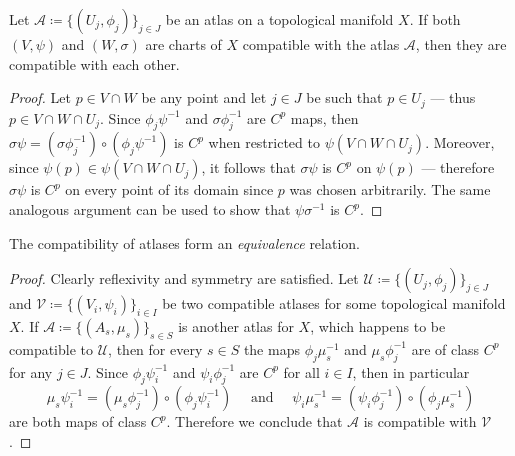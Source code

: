 \begin{lemma}
    \label{lem:compatible-charts-with-atlas-are-compatible}
    Let \(\mathcal{A} \coloneq \{(U_j, \phi_j)\}_{j \in J}\) be an atlas on a
    topological manifold \(X\). If both \((V, \psi)\) and \((W, \sigma)\) are charts
    of \(X\) compatible with the atlas \(\mathcal{A}\), then they are compatible
    with each other.
\end{lemma}

\begin{proof}
    Let \(p \in V \cap W\) be any point and let \(j \in J\) be such that
    \(p \in U_j\) --- thus \(p \in V \cap W \cap U_j\). Since \(\phi_j \psi^{-1}\)
    and \(\sigma \phi_j^{-1}\) are \(C^p\) maps, then
    \(\sigma \psi = (\sigma \phi_j^{-1}) \circ (\phi_j \psi^{-1})\) is \(C^p\) when
    restricted to \(\psi(V \cap W \cap U_j)\). Moreover, since
    \(\psi(p) \in \psi(V \cap W \cap U_j)\), it follows that \(\sigma \psi\) is
    \(C^p\) on \(\psi(p)\) --- therefore \(\sigma \psi\) is \(C^p\) on every point
    of its domain since \(p\) was chosen arbitrarily. The same analogous argument
    can be used to show that \(\psi \sigma^{-1}\) is \(C^p\).
\end{proof}

\begin{proposition}
    \label{prop:compatible-atlas-equivalence-relation}
    The compatibility of atlases form an \emph{equivalence} relation.
\end{proposition}

\begin{proof}
    Clearly reflexivity and symmetry are satisfied. Let
    \(\mathcal{U} \coloneq \{(U_{j}, \phi_j)\}_{j \in J}\) and
    \(\mathcal{V} \coloneq \{(V_{i}, \psi_i)\}_{i \in I}\) be two compatible atlases
    for some topological manifold \(X\). If
    \(\mathcal{A} \coloneq \{(A_{s}, \mu_s)\}_{s \in S}\) is another atlas for
    \(X\), which happens to be compatible to \(\mathcal{U}\), then for every
    \(s \in S\) the maps \(\phi_j \mu_{s}^{-1}\) and \(\mu_s \phi_j^{-1}\)
    are of class \(C^p\) for any \(j \in J\). Since \(\phi_j \psi_i^{-1}\) and
    \(\psi_i \phi_j^{-1}\) are \(C^p\) for all \(i \in I\), then in particular
    \[
        \mu_s \psi_i^{-1} = (\mu_s \phi_j^{-1}) \circ (\phi_j \psi_i^{-1})
        \quad\text{ and }\quad
        \psi_i \mu_s^{-1} = (\psi_i \phi_j^{-1}) \circ (\phi_j \mu_s^{-1})
    \]
    are both maps of class \(C^p\). Therefore we conclude that \(\mathcal{A}\) is
    compatible with \(\mathcal{V}\).
\end{proof}

